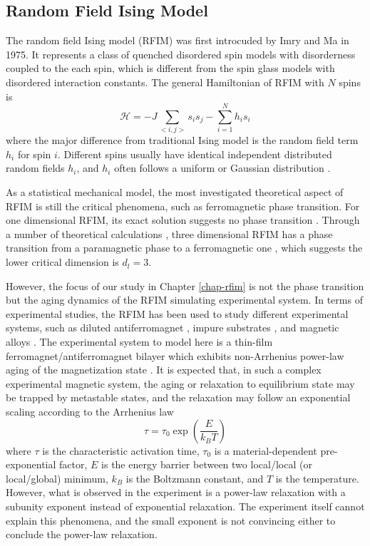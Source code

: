 \subsection{Random Field Ising Model}
\label{sec:intro-rfim}
The random field Ising model (RFIM) was first introcuded by Imry and Ma \cite{imry1975random} in 1975. It represents a class of quenched disordered spin models \cite{young1997spin} with  disorderness coupled to the each spin, which is different from the spin glass models with disordered interaction constants. The general Hamiltonian of RFIM with $N$ spins is
\begin{equation}
\mathcal{H}=-J\sum_{<i,j>}s_{i}s_{j}-\sum_{i=1}^{N}h_{i}s_{i}
\end{equation}
where the major difference from traditional Ising model is the random field term $h_i$ for spin $i$. Different spins usually have  identical independent distributed random fields $h_i$, and $h_i$ often follows a uniform \cite{nattermann1997theory} or Gaussian distribution \cite{newman1999}.

As a statistical mechanical model, the most investigated theoretical aspect of RFIM is still the critical phenomena, such as ferromagnetic phase transition. For one dimensional RFIM, its exact solution suggests no phase transition \cite{grinstein1983exact}. Through a number of theoretical calculations \cite{parisi1979random, bricmont1987lower}, three dimensional RFIM has a phase transition from a paramagnetic phase to a ferromagnetic one  \cite{bricmont1987lower}, which suggests the lower critical dimension is $d_l = 3$. 

However, the focus of our study in Chapter \ref{chap-rfim} is not the phase transition but the aging dynamics of the RFIM simulating experimental system. In terms of experimental studies, the RFIM has been used to study different experimental systems, such as diluted antiferromagnet \cite{fernandez1988random}, impure substrates \cite{villain1982commensurate}, and magnetic alloys \cite{fisher1988theory}. 
The experimental system to model here is a thin-film ferromagnet/antiferromagnet bilayer which exhibits non-Arrhenius power-law aging of the magnetization state \cite{ma2016prb}. 
It is expected that, in such a complex experimental magnetic system, the aging or relaxation to equilibrium state may be trapped by metastable states, and the relaxation may follow an exponential scaling according to the Arrhenius law \cite{Arrhenius1989}
\begin{equation}
\tau = \tau_0 \exp \left( \frac{E}{k_B T}\right)
\end{equation}
where $\tau$ is the characteristic activation time, $\tau_0$ is a material-dependent pre-exponential factor, $E$ is the energy barrier between two local/local (or local/global) minimum, $k_B$ is the Boltzmann constant, and $T$ is the temperature. However, what is observed in the experiment is a power-law relaxation with a subunity exponent instead of exponential relaxation. The experiment itself cannot explain this phenomena, and the small exponent is not convincing either to conclude the power-law relaxation. 

